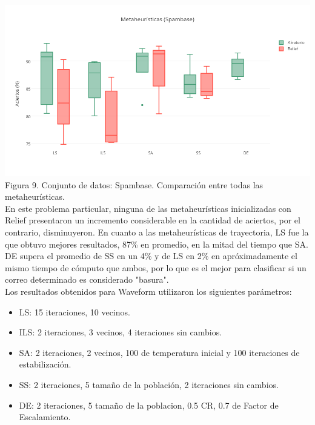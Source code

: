 \documentclass{ci5652}
\begin{document}
\includegraphics[width=\columnwidth]{metaheuristicas_Spambase}
{\small Figura 9. Conjunto de datos: Spambase. Comparación entre todas las
metaheurísticas.}\\

En este problema particular, ninguna de las metaheurísticas inicializadas con
Relief presentaron un incremento considerable en la cantidad de aciertos, por el
contrario, disminuyeron. En cuanto a las metaheurísticas de trayectoria, LS fue
la que obtuvo mejores resultados, 87\% en promedio, en la mitad del tiempo que
SA.\\

DE supera el promedio de SS en un 4\% y de LS en 2\% en apróximadamente el mismo
tiempo de cómputo que ambos, por lo que es el mejor para clasificar si un correo
determinado es considerado "basura".\\

Los resultados obtenidos para Waveform utilizaron los siguientes parámetros:

\begin{itemize}
  \item LS: 15 iteraciones, 10 vecinos.
  \item ILS: 2 iteraciones, 3 vecinos, 4 iteraciones sin cambios.
  \item SA: 2 iteraciones, 2 vecinos, 100 de temperatura inicial y 100
  iteraciones de estabilización.
  \item SS: 2 iteraciones, 5 tamaño de la población, 2 iteraciones sin cambios.
  \item DE: 2 iteraciones, 5 tamaño de la poblacion, 0.5 CR, 0.7 de Factor de
  Escalamiento.
\end{itemize}
\end{document}
